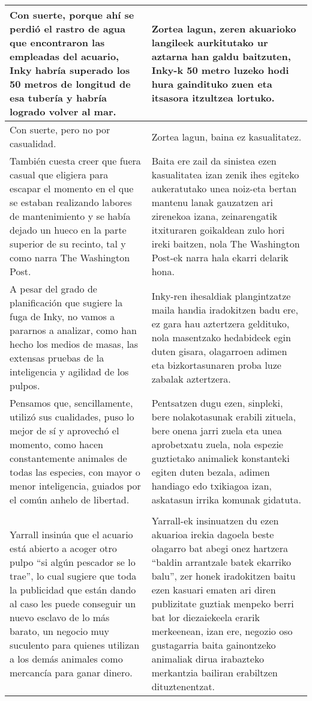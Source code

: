 \documentclass{article}
\begin{document}
\begin{center}
\begin{longtable}{|p{6cm}|p{6cm}|}
  \midrule
  Con suerte, porque ahí se perdió el rastro de agua que encontraron las empleadas del acuario, Inky habría superado los 50 metros de longitud de esa tubería y habría logrado volver al mar.&
  Zortea lagun, zeren akuarioko langileek aurkitutako ur aztarna han galdu baitzuten, Inky-k 50 metro luzeko hodi hura gaindituko zuen eta itsasora itzultzea lortuko.\\

  \midrule
  Con suerte, pero no por casualidad.&
  Zortea lagun, baina ez kasualitatez.\\

  \midrule
  También cuesta creer que fuera casual que eligiera para escapar el momento en el que se estaban realizando labores de mantenimiento y se había dejado un hueco en la parte superior de su recinto, tal y como narra The Washington Post.&
  Baita ere zail da sinistea ezen kasualitatea izan zenik ihes egiteko aukeratutako unea noiz-eta bertan mantenu lanak gauzatzen ari zirenekoa izana, zeinarengatik itxituraren goikaldean zulo hori ireki baitzen, nola The Washington Post-ek narra hala ekarri delarik hona.\\

  \midrule
  A pesar del grado de planificación que sugiere la fuga de Inky, no vamos a pararnos a analizar, como han hecho los medios de masas, las extensas pruebas de la inteligencia y agilidad de los pulpos.&
  Inky-ren ihesaldiak plangintzatze maila handia iradokitzen badu ere, ez gara hau aztertzera geldituko, nola masentzako hedabideek egin duten gisara, olagarroen adimen eta bizkortasunaren proba luze zabalak aztertzera.\\

  \midrule
  Pensamos que, sencillamente, utilizó sus cualidades, puso lo mejor de sí y aprovechó el momento, como hacen constantemente animales de todas las especies, con mayor o menor inteligencia, guiados por el común anhelo de libertad.&
  Pentsatzen dugu ezen, sinpleki, bere nolakotasunak erabili zituela, bere onena jarri zuela eta unea aprobetxatu zuela, nola espezie guztietako animaliek konstanteki egiten duten bezala, adimen handiago edo txikiagoa izan, askatasun irrika komunak gidatuta.\\

  \midrule
  \cellcolor{lightgray}{\textbf{Párrafo}} &
  \cellcolor{lightgray}{\textbf{Paragrafoa}}\\

  \midrule
  Yarrall insinúa que el acuario está abierto a acoger otro pulpo ``si algún pescador se lo trae'', lo cual sugiere que toda la publicidad que están dando al caso les puede conseguir un nuevo esclavo de lo más barato, un negocio muy suculento para quienes utilizan a los demás animales como mercancía para ganar dinero.&
  Yarrall-ek insinuatzen du ezen akuarioa irekia dagoela beste olagarro bat abegi onez hartzera ``baldin arrantzale batek ekarriko balu'', zer honek iradokitzen baitu ezen kasuari ematen ari diren publizitate guztiak menpeko berri bat lor diezaiekeela erarik merkeenean, izan ere, negozio oso gustagarria baita gainontzeko animaliak dirua irabazteko merkantzia bailiran erabiltzen dituztenentzat.\\


\end{longtable}
\end{center}
\end{document}
